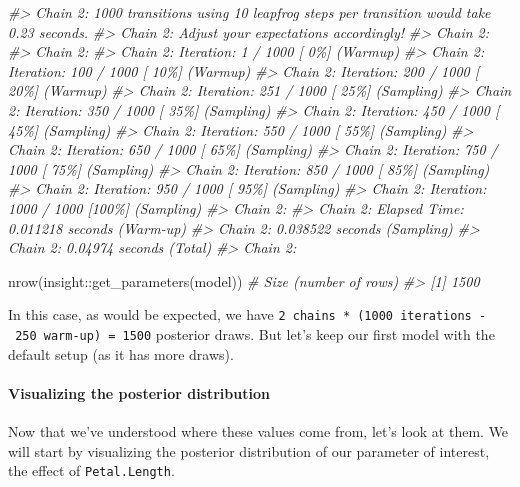 \documentclass[10pt,a4paper,onecolumn]{article}
\newenvironment{Shaded}{\begin{snugshade}}{\end{snugshade}}
\newcommand{\CommentTok}[1]{\textcolor[rgb]{0.56,0.35,0.01}{\textit{#1}}}
\newcommand{\FunctionTok}[1]{\textcolor[rgb]{0.00,0.00,0.00}{#1}}
\newcommand{\NormalTok}[1]{#1}
\newcommand{\SpecialCharTok}[1]{\textcolor[rgb]{0.00,0.00,0.00}{#1}}
\let\oldparagraph\paragraph
\renewcommand{\paragraph}[1]{\oldparagraph{#1}\mbox{}}
\begin{document}
\begin{Shaded}
\begin{Highlighting}[]
\CommentTok{\#\textgreater{} Chain 2: 1000 transitions using 10 leapfrog steps per transition would take 0.23 seconds.}
\CommentTok{\#\textgreater{} Chain 2: Adjust your expectations accordingly!}
\CommentTok{\#\textgreater{} Chain 2: }
\CommentTok{\#\textgreater{} Chain 2: }
\CommentTok{\#\textgreater{} Chain 2: Iteration:   1 / 1000 [  0\%]  (Warmup)}
\CommentTok{\#\textgreater{} Chain 2: Iteration: 100 / 1000 [ 10\%]  (Warmup)}
\CommentTok{\#\textgreater{} Chain 2: Iteration: 200 / 1000 [ 20\%]  (Warmup)}
\CommentTok{\#\textgreater{} Chain 2: Iteration: 251 / 1000 [ 25\%]  (Sampling)}
\CommentTok{\#\textgreater{} Chain 2: Iteration: 350 / 1000 [ 35\%]  (Sampling)}
\CommentTok{\#\textgreater{} Chain 2: Iteration: 450 / 1000 [ 45\%]  (Sampling)}
\CommentTok{\#\textgreater{} Chain 2: Iteration: 550 / 1000 [ 55\%]  (Sampling)}
\CommentTok{\#\textgreater{} Chain 2: Iteration: 650 / 1000 [ 65\%]  (Sampling)}
\CommentTok{\#\textgreater{} Chain 2: Iteration: 750 / 1000 [ 75\%]  (Sampling)}
\CommentTok{\#\textgreater{} Chain 2: Iteration: 850 / 1000 [ 85\%]  (Sampling)}
\CommentTok{\#\textgreater{} Chain 2: Iteration: 950 / 1000 [ 95\%]  (Sampling)}
\CommentTok{\#\textgreater{} Chain 2: Iteration: 1000 / 1000 [100\%]  (Sampling)}
\CommentTok{\#\textgreater{} Chain 2: }
\CommentTok{\#\textgreater{} Chain 2:  Elapsed Time: 0.011218 seconds (Warm{-}up)}
\CommentTok{\#\textgreater{} Chain 2:                0.038522 seconds (Sampling)}
\CommentTok{\#\textgreater{} Chain 2:                0.04974 seconds (Total)}
\CommentTok{\#\textgreater{} Chain 2:}

\FunctionTok{nrow}\NormalTok{(insight}\SpecialCharTok{::}\FunctionTok{get\_parameters}\NormalTok{(model)) }\CommentTok{\# Size (number of rows)}
\CommentTok{\#\textgreater{} [1] 1500}
\end{Highlighting}
\end{Shaded}

In this case, as would be expected, we have
\texttt{2\ chains\ *\ (1000\ iterations\ -\ 250\ warm-up)\ =\ 1500}
posterior draws. But let's keep our first model with the default setup
(as it has more draws).

\hypertarget{visualizing-the-posterior-distribution}{%
\paragraph{Visualizing the posterior
distribution}\label{visualizing-the-posterior-distribution}}

Now that we've understood where these values come from, let's look at
them. We will start by visualizing the posterior distribution of our
parameter of interest, the effect of \texttt{Petal.Length}.
\end{document}

